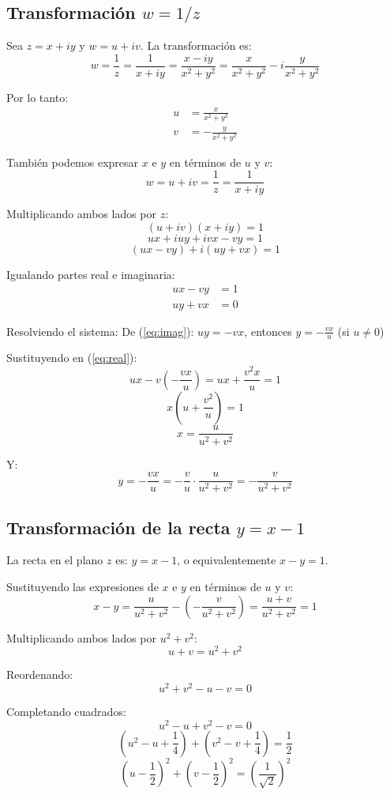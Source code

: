 \documentclass{article}
\begin{document}
\subsection*{Transformación $w = 1/z$}

Sea $z = x + iy$ y $w = u + iv$. La transformación es:
$$w = \frac{1}{z} = \frac{1}{x + iy} = \frac{x - iy}{x^2 + y^2} = \frac{x}{x^2 + y^2} - i\frac{y}{x^2 + y^2}$$

Por lo tanto:
\begin{align}
u &= \frac{x}{x^2 + y^2} \label{eq:u} \\
v &= -\frac{y}{x^2 + y^2} \label{eq:v}
\end{align}

También podemos expresar $x$ e $y$ en términos de $u$ y $v$:
$$w = u + iv = \frac{1}{z} = \frac{1}{x + iy}$$

Multiplicando ambos lados por $z$:
$$(u + iv)(x + iy) = 1$$
$$ux + iuy + ivx - vy = 1$$
$$(ux - vy) + i(uy + vx) = 1$$

Igualando partes real e imaginaria:
\begin{align}
ux - vy &= 1 \label{eq:real} \\
uy + vx &= 0 \label{eq:imag}
\end{align}

Resolviendo el sistema:
De (\ref{eq:imag}): $uy = -vx$, entonces $y = -\frac{vx}{u}$ (si $u \neq 0$)

Sustituyendo en (\ref{eq:real}):
$$ux - v\left(-\frac{vx}{u}\right) = ux + \frac{v^2x}{u} = 1$$
$$x\left(u + \frac{v^2}{u}\right) = 1$$
$$x = \frac{u}{u^2 + v^2}$$

Y:
$$y = -\frac{vx}{u} = -\frac{v}{u} \cdot \frac{u}{u^2 + v^2} = -\frac{v}{u^2 + v^2}$$

\subsection*{Transformación de la recta $y = x - 1$}

La recta en el plano $z$ es: $y = x - 1$, o equivalentemente $x - y = 1$.

Sustituyendo las expresiones de $x$ e $y$ en términos de $u$ y $v$:
$$x - y = \frac{u}{u^2 + v^2} - \left(-\frac{v}{u^2 + v^2}\right) = \frac{u + v}{u^2 + v^2} = 1$$

Multiplicando ambos lados por $u^2 + v^2$:
$$u + v = u^2 + v^2$$

Reordenando:
$$u^2 + v^2 - u - v = 0$$

Completando cuadrados:
$$u^2 - u + v^2 - v = 0$$
$$\left(u^2 - u + \frac{1}{4}\right) + \left(v^2 - v + \frac{1}{4}\right) = \frac{1}{2}$$
$$\left(u - \frac{1}{2}\right)^2 + \left(v - \frac{1}{2}\right)^2 = \left(\frac{1}{\sqrt{2}}\right)^2$$
\end{document}
